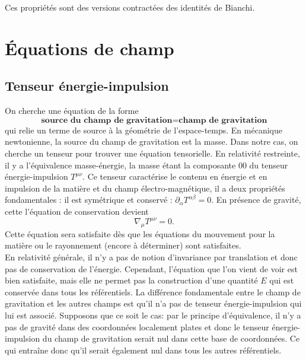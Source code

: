 \documentclass[a4paper,11pt]{report}
\theoremstyle{definition}
\theoremstyle{plain}
\theoremstyle{definition}
\theoremstyle{remark}
\newcommand{\p}{\partial}
\begin{document}
        Ces propriétés sont des versions contractées des identités de Bianchi.
                
    \section{Équations de champ}
    
        \subsection{Tenseur énergie-impulsion}
        
            On cherche une équation de la forme
            \begin{equation*}
                \textbf{source du champ de gravitation} = \textbf{champ de gravitation}
            \end{equation*}
            qui relie un terme de source à la géométrie de l'espace-temps. En mécanique newtonienne, la source du champ de gravitation est la masse. Dans notre cas, on cherche un tenseur pour trouver une équation tensorielle. En relativité restreinte, il y a l'équivalence masse-énergie, la masse étant la composante $00$ du tenseur énergie-impulsion $T^{\mu\nu}$. Ce tenseur caractérise le contenu en énergie et en impulsion de la matière et du champ électro-magnétique, il a deux propriétés fondamentales : il est symétrique et conservé : $\p_\alpha T^{\alpha\beta} = 0$. En présence de gravité, cette l'équation de conservation devient
            \begin{equation}
                \nabla_\mu T^{\mu\nu} = 0.
            \end{equation}
            Cette équation sera satisfaite dès que les équations du mouvement pour la matière ou le rayonnement (encore à déterminer) sont satisfaites.\\
            
            En relativité générale, il n'y a pas de notion d'invariance par translation et donc pas de conservation de l'énergie. Cependant, l'équation que l'on vient de voir est bien satisfaite, mais elle ne permet pas la construction d'une quantité $E$ qui est conservée dans tous les référentiels. La différence fondamentale entre le champ de gravitation et les autres champs est qu'il n'a pas de tenseur énergie-impulsion qui lui est associé. Supposons que ce soit le cas: par le principe d'équivalence, il n'y a pas de gravité dans des coordonnées localement plates et donc le tenseur énergie-impulsion du champ de gravitation serait nul dans cette base de coordonnées. Ce qui entraîne donc qu'il serait également nul dans tous les autres référentiels.
            
\end{document}

